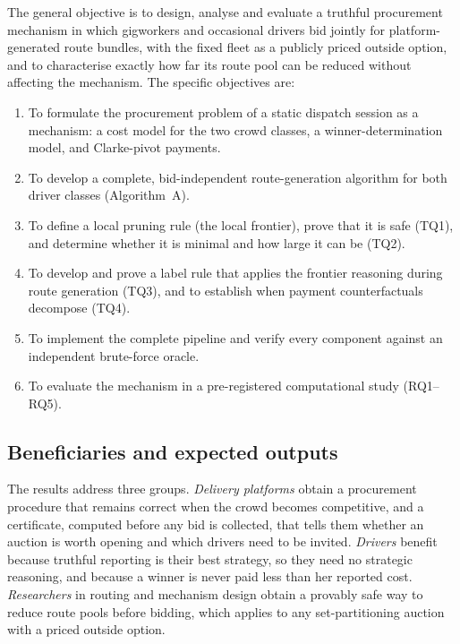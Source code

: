 The general objective is to design, analyse and evaluate a truthful
procurement mechanism in which gigworkers and occasional drivers bid jointly
for platform-generated route bundles, with the fixed fleet as a publicly
priced outside option, and to characterise exactly how far its route pool
can be reduced without affecting the mechanism. The specific objectives are:
\begin{enumerate}[label=O\arabic*.,leftmargin=1.2cm,itemsep=2pt]
\item To formulate the procurement problem of a static dispatch session as a
mechanism: a cost model for the two crowd classes, a winner-determination
model, and Clarke-pivot payments.
\item To develop a complete, bid-independent route-generation algorithm for
both driver classes (Algorithm~A).
\item To define a local pruning rule (the local frontier), prove that it is
safe (TQ1), and determine whether it is minimal and how large it can be
(TQ2).
\item To develop and prove a label rule that applies the frontier reasoning
during route generation (TQ3), and to establish when payment counterfactuals
decompose (TQ4).
\item To implement the complete pipeline and verify every component against
an independent brute-force oracle.
\item To evaluate the mechanism in a pre-registered computational study
(RQ1--RQ5).
\end{enumerate}

\subsection{Beneficiaries and expected outputs}

The results address three groups.
\emph{Delivery platforms} obtain a procurement procedure that remains
correct when the crowd becomes competitive, and a certificate, computed
before any bid is collected, that tells them whether an auction is worth
opening and which drivers need to be invited. \emph{Drivers} benefit
because truthful reporting is their best strategy, so they need no
strategic reasoning, and because a winner is never paid less than her
reported cost. \emph{Researchers} in routing and mechanism design obtain a
provably safe way to reduce route pools before bidding, which applies to any
set-partitioning auction with a priced outside option.

